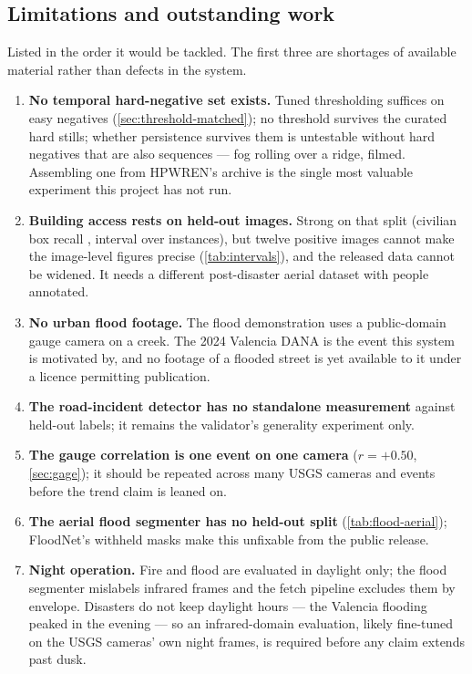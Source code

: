 \subsection{Limitations and outstanding work}
\label{sec:outstanding}

Listed in the order it would be tackled. The first three are shortages of
available material rather than defects in the system.

\begin{enumerate}
  \item \textbf{No temporal hard-negative set exists.} Tuned thresholding
        suffices on easy negatives (\cref{sec:threshold-matched}); no
        threshold survives the curated hard stills; whether persistence
        survives them is untestable without hard negatives that are also
        sequences — fog rolling over a ridge, filmed. Assembling one from
        HPWREN's archive is the single most valuable experiment this project
        has not run.
  \item \textbf{Building access rests on \BuildingTestImages{} held-out
        images.} Strong on that split (civilian box recall
        \BuildingBoxRecall, interval \BuildingCivilianRecallCI{} over
        instances), but twelve positive images cannot make the image-level
        figures precise (\cref{tab:intervals}), and the released data cannot
        be widened. It needs a different post-disaster aerial dataset with
        people annotated.
  \item \textbf{No urban flood footage.} The flood demonstration uses a
        public-domain gauge camera on a creek. The 2024 Valencia DANA is the
        event this system is motivated by, and no footage of a flooded
        street is yet available to it under a licence permitting publication.
  \item \textbf{The road-incident detector has no standalone measurement}
        against held-out labels; it remains the validator's generality
        experiment only.
  \item \textbf{The gauge correlation is one event on one camera}
        ($r = +0.50$, \cref{sec:gage}); it should be repeated across many
        USGS cameras and events before the trend claim is leaned on.
  \item \textbf{The aerial flood segmenter has no held-out split}
        (\cref{tab:flood-aerial}); FloodNet's withheld masks make this
        unfixable from the public release.
  \item \textbf{Night operation.} Fire and flood are evaluated in daylight
        only; the flood segmenter mislabels infrared frames and the fetch
        pipeline excludes them by envelope. Disasters do not keep daylight
        hours — the Valencia flooding peaked in the evening — so an
        infrared-domain evaluation, likely fine-tuned on the USGS cameras'
        own night frames, is required before any claim extends past dusk.
\end{enumerate}
